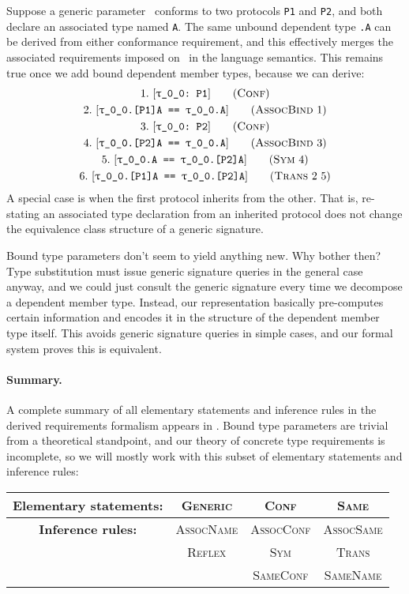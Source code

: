 \documentclass[../generics]{subfiles}
\begin{document}
\begin{example}\label{assoc bind example}
Suppose a generic parameter \rT\ conforms to two protocols \texttt{P1} and \texttt{P2}, and both declare an associated type named \texttt{A}. The same unbound dependent type \texttt{\rT.A} can be derived from either conformance requirement, and this effectively merges the associated requirements imposed on \nA\ in the language semantics. This remains true once we add bound dependent member types, because we can derive:
\begin{gather*}
\ConfStep{\rT}{P1}{1}\\
\AssocBindStep{1}{\rT.[P1]A}{\rT.A}{2}\\
\ConfStep{\rT}{P2}{3}\\
\AssocBindStep{3}{\rT.[P2]A}{\rT.A}{4}\\
\SymStep{4}{\rT.A}{\rT.[P2]A}{5}\\
\TransStep{2}{5}{\rT.[P1]A}{\rT.[P2]A}{6}
\end{gather*}
A special case is when the first protocol inherits from the other. That is, re-stating an associated type declaration from an inherited protocol does not change the equivalence class structure of a generic signature.
\end{example}

Bound type parameters don't seem to yield anything new. Why bother then? Type substitution must issue generic signature queries in the general case anyway, and we could just consult the generic signature every time we decompose a dependent member type. Instead, our representation basically pre-computes certain information and encodes it in the structure of the dependent member type itself. This avoids generic signature queries in simple cases, and our formal system proves this is equivalent. 

\paragraph{Summary.}
A complete summary of all elementary statements and inference rules in the derived requirements formalism appears in . Bound type parameters are trivial from a theoretical standpoint, and our theory of concrete type requirements is incomplete, so we will mostly work with this subset of elementary statements and inference rules:
\begin{center}
\begin{tabular}{cccc}
\toprule
\textbf{Elementary statements:}&\textsc{Generic}&\textsc{Conf}&\textsc{Same}\\
\midrule
\textbf{Inference rules:}&\textsc{AssocName}&\textsc{AssocConf}&\textsc{AssocSame}\\
&\textsc{Reflex}&\textsc{Sym}&\textsc{Trans}\\
&&\textsc{SameConf}&\textsc{SameName}\\
\bottomrule
\end{tabular}
\end{center}
\end{document}
